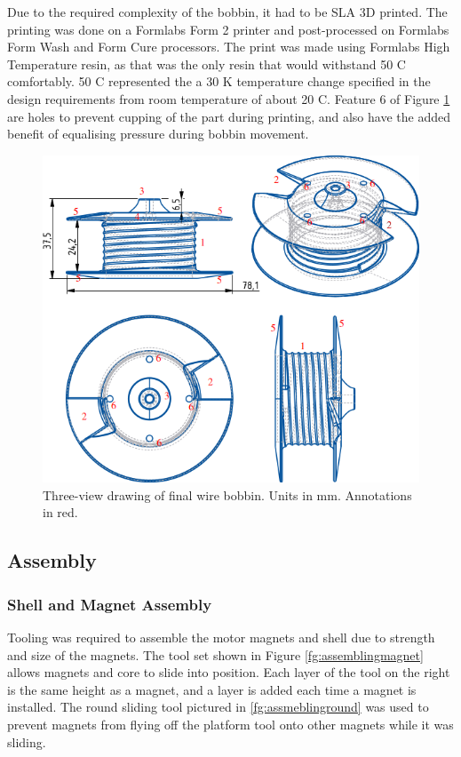 \documentclass[a4paper,12pt]{article}
\begin{document}
Due to the required complexity of the bobbin, it had to be SLA 3D printed. The printing was done on a Formlabs Form 2 printer and post-processed on Formlabs Form Wash and Form Cure processors. The print was made using Formlabs High Temperature resin, as that was the only resin that would withstand 50 \degree C comfortably. 50 \degree C represented the a 30 K temperature change specified in the design requirements from room temperature of about 20 \degree C. Feature 6 of Figure \ref{fg:bobbin} are holes to prevent cupping of the part during printing, and also have the added benefit of equalising pressure during bobbin movement.

\begin{figure}[h!]
    \centering
    \includegraphics[scale=0.5]{bobbin.png}
    \caption{Three-view drawing of final wire bobbin. Units in mm. Annotations in red.}
    \label{fg:bobbin}
\end{figure}

\subsection{Assembly}

\subsubsection{Shell and Magnet Assembly} \label{section:shellassembly}

Tooling was required to assemble the motor magnets and shell due to strength and size of the magnets. The tool set shown in Figure \ref{fg:assemblingmagnet} allows magnets and core to slide into position. Each layer of the tool on the right is the same height as a magnet, and a layer is added each time a magnet is installed. The round sliding tool pictured in \ref{fg:assmeblinground} was used to prevent magnets from flying off the platform tool onto other magnets while it was sliding.
\end{document}
